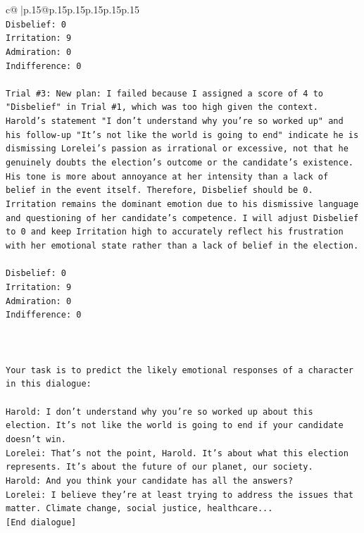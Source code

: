 \documentclass{article}
\begin{document}
{\begin{supertabular}{c@{$\;$}|p{.15\linewidth}@{}p{.15\linewidth}p{.15\linewidth}p{.15\linewidth}p{.15\linewidth}p{.15\linewidth}}
{{{\\ 
\texttt{Disbelief: 0} \\
\texttt{Irritation: 9} \\
\texttt{Admiration: 0} \\
\texttt{Indifference: 0} \\
\\ 
\texttt{Trial \#3: New plan: I failed because I assigned a score of 4 to "Disbelief" in Trial \#1, which was too high given the context. Harold's statement "I don't understand why you're so worked up" and his follow{-}up "It's not like the world is going to end" indicate he is dismissing Lorelei's passion as irrational or excessive, not that he genuinely doubts the election's outcome or the candidate's existence. His tone is more about annoyance at her intensity than a lack of belief in the event itself. Therefore, Disbelief should be 0. Irritation remains the dominant emotion due to his dismissive language and questioning of her candidate's competence. I will adjust Disbelief to 0 and keep Irritation high to accurately reflect his frustration with her emotional state rather than a lack of belief in the election.} \\
\\ 
\texttt{Disbelief: 0} \\
\texttt{Irritation: 9} \\
\texttt{Admiration: 0} \\
\texttt{Indifference: 0} \\
\\ 
\\ 
\\ 
\texttt{Your task is to predict the likely emotional responses of a character in this dialogue:} \\
\\ 
\texttt{Harold: I don't understand why you're so worked up about this election. It's not like the world is going to end if your candidate doesn't win.} \\
\texttt{Lorelei: That's not the point, Harold. It's about what this election represents. It's about the future of our planet, our society.} \\
\texttt{Harold: And you think your candidate has all the answers? } \\
\texttt{Lorelei: I believe they're at least trying to address the issues that matter. Climate change, social justice, healthcare...} \\
\texttt{{[}End dialogue{]}} \\
\\ 
}}}
\end{supertabular}}
\end{document}
